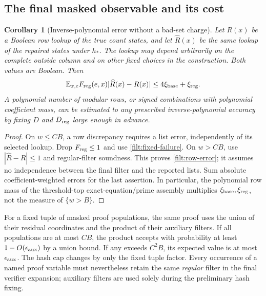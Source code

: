 \documentclass[11pt,letterpaper]{article}
\newtheorem{corollary}[theorem]{Corollary}
\theoremstyle{definition}
\theoremstyle{remark}
\begin{document}
\subsection{The final masked observable and its cost}
\label{filt:observable-subsection}

\begin{corollary}[Inverse-polynomial error without a bad-set charge]
\label{filt:observable}
Let $R(x)$ be a Boolean row lookup of the true count states, and let
$\widehat R(x)$ be the same lookup of the repaired states under $h_*$.
The lookup may depend arbitrarily on the complete outside column and
on other fixed choices in the construction.  Both values are Boolean.
Then
\begin{equation}\label{filt:row-error}
 \mathbb E_{x,e}F_{\rm reg}(e,x)
       |\widehat R(x)-R(x)|
 \le4\xi_{\rm base}+\xi_{\rm reg}.
\end{equation}
A polynomial number of modular rows, or signed combinations with
polynomial coefficient mass, can be estimated to any prescribed
inverse-polynomial accuracy by fixing $D$ and $D_{\rm reg}$ large
enough in advance.
\end{corollary}

\begin{proof}
On $w\le CB$, a row discrepancy requires a list error, independently
of its selected lookup.  Drop $F_{\rm reg}\le1$ and use
\eqref{filt:fixed-failure}.  On $w>CB$, use
$|\widehat R-R|\le1$ and regular-filter soundness.  This proves
\eqref{filt:row-error}; it assumes no independence between the final
filter and the reported lists.  Sum absolute coefficient-weighted
errors for the last assertion.  In particular, the polynomial row
mass of the threshold-top exact-equation/prime assembly multiplies
$\xi_{\rm base},\xi_{\rm reg}$, not the measure of $\{w>B\}$.
\end{proof}

For a fixed tuple of masked proof populations, the same proof uses the
union of their residual coordinates and the product of their
auxiliary filters.  If all populations are at most $CB$, the product
accepts with probability at least $1-O(\epsilon_{\rm aux})$ by a union
bound.  If any exceeds $C^2B$, its expected value is at most
$\epsilon_{\rm aux}$.  The hash cap changes by only the fixed tuple
factor.  Every occurrence of a named proof variable must nevertheless
retain the same \emph{regular} filter in the final verifier expansion;
auxiliary filters are used solely during the preliminary hash fixing.
\end{document}

